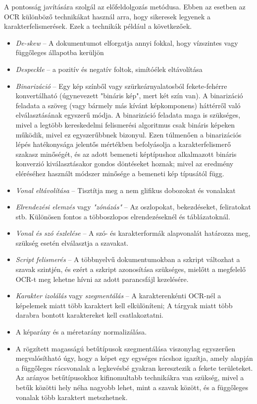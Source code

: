A pontosság javítására szolgál az előfeldolgozás metódusa. Ebben az esetben az OCR különböző technikákat használ arra, hogy sikeresek legyenek a karakterfelismerések. Ezek a technikák például a következőek.
\begin{itemize}
	\item \textit{De-skew} -- A dokumentumot elforgatja annyi fokkal, hogy vízszintes vagy függőleges állapotba kerüljön
	
	\item \textit{Despeckle} -- a pozitív és negatív foltok, simítóélek eltávolítása
	
	\item \textit{Binarizáció} -- Egy kép színből vagy szürkeárnyalatosból fekete-fehérre konvertálható (úgynevezett "bináris kép", mert két szín van). A binarizáció feladata a szöveg (vagy bármely
	más kívánt képkomponens) háttérről való elválasztásának egyszerű módja. A binarizáció feladata maga is szükséges, mivel a legtöbb kereskedelmi felismerési algoritmus csak bináris képeken működik, mivel ez egyszerűbbnek bizonyul. Ezen túlmenően a binarizációs lépés hatékonysága jelentős mértékben befolyásolja a karakterfelismerő szakasz minőségét, és az adott bemeneti képtípushoz alkalmazott bináris konverzió kiválasztásakor gondos döntéseket hoznak; mivel az eredmény eléréséhez használt módszer minősége a bemeneti kép típusától függ.
	
	\item \textit{Vonal eltávolítása} -- Tisztítja meg a nem glifikus dobozokat és vonalakat
	
	\item \textit{Elrendezési elemzés} vagy \textit{"zónázás"} -- Az oszlopokat, bekezdéseket, feliratokat stb. Különösen fontos a többoszlopos elrendezéseknél és táblázatoknál.
	
	\item \textit{Vonal és szó észlelése} -- A szó- és karakterformák alapvonalát határozza meg, szükség esetén elválasztja a szavakat.
	
	\item \textit{Script felismerés} -- A többnyelvű dokumentumokban a szkript változhat a szavak szintjén, és ezért a szkript azonosítása szükséges, mielőtt a megfelelő OCR-t meg lehetne hívni az
	adott parancsfájl kezelésére.
	
	\item \textit{Karakter izolálás} vagy \textit{szegmentálás} -- A karakterenkénti OCR-nél a képelemek miatt több karaktert kell elkülöníteni; A tárgyak miatt több darabra bontott karaktereket kell
	csatlakoztatni.
	
	\item A képarány és a méretarány normalizálása.
	
	\item A rögzített magasságú betűtípusok szegmentálása viszonylag egyszerűen megvalósítható úgy, hogy a képet egy egységes rácshoz igazítja, amely alapján a függőleges rácsvonalak a legkevésbé gyakran keresztezik a fekete területeket. Az arányos betűtípusokhoz kifinomultabb technikákra van szükség, mivel a betűk közötti hely néha nagyobb lehet, mint a szavak között, és a függőleges vonalak több karaktert metszhetnek.
\end{itemize}

